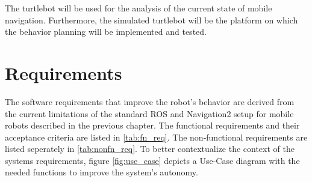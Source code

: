 The turtlebot will be used for the analysis of the current state of mobile navigation. Furthermore, the simulated turtlebot will be the platform on which the behavior planning will be implemented and tested.\\


\section{Requirements}

The software requirements that improve the robot's behavior are derived from the current limitations of the standard ROS and Navigation2 setup for mobile robots described in the previous chapter. 
The functional requirements and their acceptance criteria are listed in \ref{tab:fn_req}. The non-functional requirements are listed seperately in \ref{tab:nonfn_req}. 
To better contextualize the context of the systems requirements, figure \ref{fig:use_case} depicts a Use-Case diagram with the needed functions to improve the system's autonomy.

